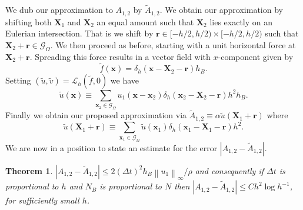 \documentclass[preprint,12pt]{elsarticle}
\newcommand{\norm}[1]{\left\lVert#1\right\rVert}
\newtheorem{theorem}{Theorem}[section]
\begin{document}
We dub our approximation to $A_{1,2}$ by $\tilde{A}_{1,2}$.
We obtain our approximation by shifting both $\mathbf{X}_1$ and $\mathbf{X}_2$ an equal amount such that $\mathbf{X}_2$ lies exactly on an Eulerian intersection. That is we shift by $\mathbf{r}\in[-h/2,h/2)\times[-h/2,h/2)$ such that $\mathbf{X}_2 +\mathbf{r}\in\mathcal{G}_\Omega$. We then proceed as before, starting with a unit horizontal force at $\mathbf{X}_2+\mathbf{r}$. Spreading this force results in a vector field with $x$-component given by
\begin{equation}
\tilde{f}(\mathbf{x}) = \delta_h(\mathbf{x} - \mathbf{X}_2 - \mathbf{r})h_B.
\end{equation}
Setting $(\tilde{u},\tilde{v})=\mathcal{L}_h(\tilde{f},0)$ we have
\begin{equation}
\tilde{u}(\mathbf{x}) \equiv
\sum_{\mathbf{x}_2\in\mathcal{G}_\Omega}
u_1(\mathbf{x} - \mathbf{x}_2)\delta_h(\mathbf{x}_2 - \mathbf{X}_2 - \mathbf{r})h^2h_B. \label{eq:utx}
\end{equation}
Finally we obtain our proposed approximation via $\tilde{A}_{1,2} \equiv \alpha \tilde{u}(\mathbf{X}_1+\mathbf{r})$ where
\begin{equation}
\tilde{u}(\mathbf{X}_1+\mathbf{r}) \equiv
\sum_{\mathbf{x}_1\in\mathcal{G}_\Omega}
\tilde{u}(\mathbf{x}_1)\delta_h(\mathbf{x}_1 - \mathbf{X}_1 - \mathbf{r})h^2. \label{eq:uts}
\end{equation}
We are now in a position to state an estimate for the error $|A_{1,2}-\tilde{A}_{1,2}|$.
\begin{theorem}
\label{thm:A}
$|A_{1,2}-\tilde{A}_{1,2}| \leq 2(\Delta t)^2 h_B\norm{u_1}_\infty / \rho$ and
consequently if $\Delta t$ is proportional to $h$ and $N_B$ is proportional to $N$ then
$|A_{1,2}-\tilde{A}_{1,2}| \leq C h^2\log h^{-1}$, for sufficiently small $h$.
\end{theorem}
\end{document}
